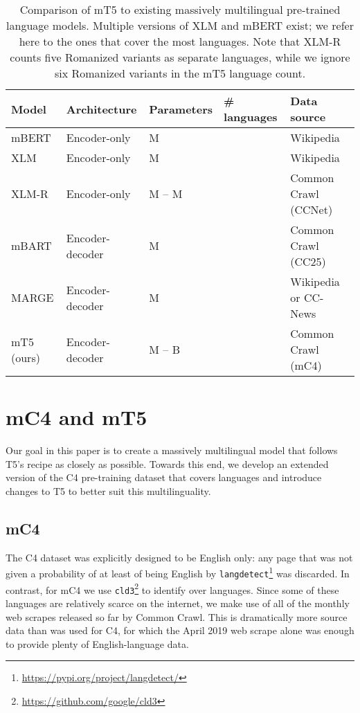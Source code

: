 \documentclass[11pt]{article}
\begin{document}
\begin{table*}
\begin{center}
\footnotesize
\begin{tabular}{ lllll } 
 \toprule
 Model & Architecture & Parameters & \# languages & Data source \\
 \midrule
 mBERT \citep{devlin2018multilingual} & Encoder-only & M &  & Wikipedia \\
 XLM \citep{conneau2019cross} & Encoder-only & M &  & Wikipedia \\
 XLM-R \citep{conneau2019unsupervised} & Encoder-only & M -- M &  & Common Crawl (CCNet) \\
 mBART \citep{lewis2019bart} & Encoder-decoder & M &  & Common Crawl (CC25) \\
 MARGE \citep{lewis2020pre} & Encoder-decoder & M &  & Wikipedia or CC-News \\
 mT5 (ours) & Encoder-decoder & M -- B &  & Common Crawl (mC4) \\
 \bottomrule
\end{tabular}
\caption{Comparison of mT5 to existing massively multilingual pre-trained language models. Multiple versions of XLM and mBERT exist; we refer here to the ones that cover the most languages. Note that XLM-R counts five Romanized variants as separate languages, while we ignore six Romanized variants in the mT5 language count.}
\label{tab:comparison}
\end{center}
\end{table*}

\section{mC4 and mT5}

Our goal in this paper is to create a massively multilingual model that follows T5's recipe as closely as possible.
Towards this end, we develop an extended version of the C4 pre-training dataset that covers  languages and introduce changes to T5 to better suit this multilinguality. 

\subsection{mC4}

The C4 dataset was explicitly designed to be English only: any page that was not given a probability of at least  of being English by \texttt{langdetect}\footnote{\url{https://pypi.org/project/langdetect/}} was discarded.
In contrast, for mC4 we use \texttt{cld3}\footnote{\url{https://github.com/google/cld3}} to identify over  languages.
Since some of these languages are relatively scarce on the internet, we make use of all of the  monthly web scrapes released so far by Common Crawl.
This is dramatically more source data than was used for C4, for which the April 2019 web scrape alone was enough to provide plenty of English-language data.
\end{document}
